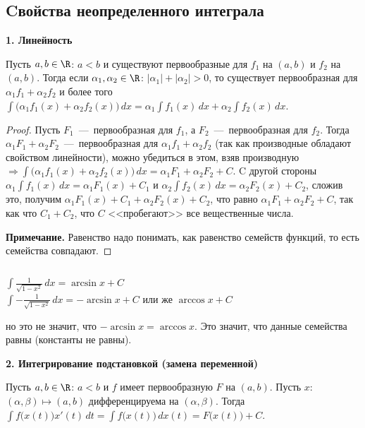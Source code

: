\subsection{Cвойства неопределенного интеграла}
\textbf{1. Линейность}
\begin{theorem}
    Пусть $a, b \in \R$: $a < b$ и существуют первообразные для $f_{1}$ на $(a, b)$ и $f_{2}$ на $(a, b)$. Тогда если $\alpha_{1}, \alpha_{2} \in \R$: $|\alpha_{1}| + |\alpha_{2}| > 0$, то существует первообразная для $\alpha_{1} f_{1} + \alpha_{2} f_{2}$ и более того $\displaystyle \int \bigg( \alpha_{1} f_{1} (x) + \alpha_{2} f_{2} (x) \bigg) \, dx = \alpha_{1} \int f_{1} (x) \, dx + \alpha_{2} \int f_{2} (x) \, dx$.
\end{theorem}
\begin{proof}
    Пусть $F_{1}$~---~первообразная для $f_{1}$, а $F_{2}$~---~первообразная для $f_{2}$. Тогда $\alpha_{1} F_{1} + \alpha_{2} F_{2}$~---~первообразная для $\alpha_{1} f_{1} + \alpha_{2} f_{2}$ (так как производные обладают свойством линейности), можно убедиться в этом, взяв производную $\displaystyle \Rightarrow \int \bigg( \alpha_{1} f_{1} (x) + \alpha_{2} f_{2} (x) \bigg) \, dx = \alpha_{1} F_{1} + \alpha_{2} F_{2} + C$. C другой стороны $\displaystyle \alpha_{1} \int f_{1} (x) \, dx = \alpha_{1} F_{1} (x) + C_{1}$ и $\displaystyle \alpha_{2} \int f_{2} (x) \, dx = \alpha_{2} F_{2} (x) + C_{2}$, сложив это, получим $\alpha_{1} F_{1} (x) + C_{1} + \alpha_{2} F_{2} (x) + C_{2}$, что равно $\alpha_{1} F_{1} + \alpha_{2} F_{2} + C$, так как что $C_{1} + C_{2}$, что $C$ <<пробегают>> все вещественные числа.
    
    \textbf{Примечание.} Равенство надо понимать, как равенство семейств функций, то есть семейства совпадают.
\end{proof}
\begin{note} $\ $
\begin{flushleft}
    $\displaystyle \int \frac{1}{\sqrt{1 - x^{2}}} \, dx = \arcsin{x} + C$ \\
    $\displaystyle \int -\frac{1}{\sqrt{1 - x^{2}}} \, dx = -\arcsin{x} + C$ или же $\displaystyle \arccos{x} + C$
\end{flushleft}
но это не значит, что $-\arcsin{x} = \arccos{x}$. Это значит, что данные семейства равны (константы не равны).
\end{note}
\textbf{2. Интегрирование подстановкой (замена переменной)}
\begin{theorem}
    Пусть $a, b \in \R$: $a < b$ и $f$ имеет первообразную $F$ на $(a, b)$. Пусть $x$: $(\alpha, \beta) \mapsto (a, b)$ дифференцируема на $(\alpha, \beta)$. Тогда $\displaystyle \int f \big( x (t) \big) x' (t) \, dt = \int f \big( x (t) \big) \, dx(t) = F \big( x(t) \big) + C$.
\end{theorem}
